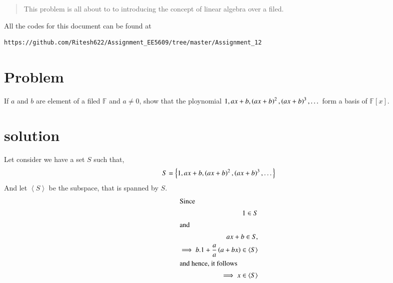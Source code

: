\documentclass[journal,12pt,twocolumn]{IEEEtran}
\begin{document}
	
	\maketitle
	\newpage
	\bigskip
	\renewcommand{\thefigure}{\theenumi}
	\renewcommand{\thetable}{\theenumi}
	\date{Today}
	

\begin{abstract}
This problem is all about to to introducing the concept of linear algebra over a filed.
\end{abstract}
All the codes for this document can be found at
\begin{lstlisting}
https://github.com/Ritesh622/Assignment_EE5609/tree/master/Assignment_12
\end{lstlisting}
\section{Problem}
If $a$ and $b$ are element of a filed $\mathbb{F}$ and $ a \neq 0$, show that the ploynomial $ 1, ax+b, \left(ax+b\right)^2, \left(ax+b\right)^3,  \dots $ form a basis of $\mathbb{F}[x].$
\section{solution}
 Let consider we have a set $S$ such that,
 \begin{align}
 S = \left \{    1, ax+b, \left(ax+b\right)^2, \left(ax+b\right)^3,  \dots  \right \}
 \end{align}
 And let $\left \langle S \right \rangle$ be the subspace, that is spanned by $S$.
 \begin{align}
 \intertext{Since}
  1 \in S\\
 \intertext{and}
  ax+b \in S,\\
  \implies  b.1 + \frac{a}{a}\left(a +bx\right) \in \left \langle S \right \rangle \\
  \intertext{and hence, it follows}
   \implies x \in \left \langle S \right \rangle 
 \end{align}
 
\end{document}
